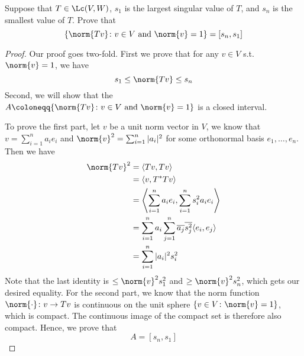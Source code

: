 \documentclass{extarticle}
\begin{document}
\begin{problem}{4}
    Suppose that \(T \in \Lc(V, W)\), \(s_1\) is the largest singular value of \(T\), and
    \(s_n\) is the smallest value of \(T\). Prove that
    \[\{\norm{Tv} \colon v \in V \text{ and } \norm{v} = 1\} = [s_n, s_1]\]
\end{problem}

\begin{proof}
Our proof goes two-fold. First we prove that for any \(v \in V\) s.t. \(\norm{v} = 1\), we have
\[s_1 \leq \norm{Tv} \leq s_n\]
Second, we will show that the \(A \coloneqq \{\norm{Tv} \colon v \in V \text{ and } \norm{v} = 1\} \)
is a closed interval.

To prove the first part, let \(v\) be a unit norm vector in \(V\), we know that
\(v = \sum_{i=1}^{n}a_i e_i\) and \(\norm{v}^2 = \sum_{i=1}^{n} |a_i|^2\) for some orthonormal
basis \(e_1, \ldots, e_n\). Then we have
\begin{align*}
    \norm{Tv}^2
    &= \langle Tv,Tv \rangle \\
    &= \langle v,T^*Tv \rangle \\
    &= \left\langle \sum_{i=1}^{n} a_i e_i, \sum_{i=1}^{n} s_i^2a_ie_i \right\rangle \\
    &= \sum_{i=1}^{n} a_i \sum_{j=1}^{n} \overline{a_j} \overline{s_j^2} \langle e_i,e_j \rangle \\
    &= \sum_{i=1}^{n} |a_i|^2 s_i^2 \\
\end{align*}
Note that the last identity is \(\leq \norm{v}^2 s_1^2\) and \(\geq \norm{v}^2 s_n^2\), which gets
our desired equality. For the second part, we know that the norm function \(\norm{\cdot} \colon
v \to Tv\) is continuous on the unit sphere \(\{v \in V \colon \norm{v}  =1\}\), which is compact. The
continuous image of the compact set is therefore also compact. Hence, we prove that
\[A = [s_n, s_1]\]
\end{proof}
\end{document}
